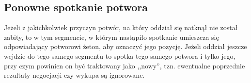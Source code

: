 \subsection{Ponowne spotkanie potwora}
Jeżeli z jakichkolwiek przyczyn potwór, na który oddział się natknął nie został zabity, to w tym segmencie, w którym nastąpiło spotkanie umieszcza się odpowiadający potworowi żeton, aby oznaczyć jego pozycję.
Jeżeli oddział jeszcze wejdzie do tego samego segmentu to spotka tego samego potwora i tylko jego, przy czym powinien on być traktowany jako ,,nowy'', tzn. ewentualne poprzednie rezultaty negocjacji czy wykupa są ignorowane.
